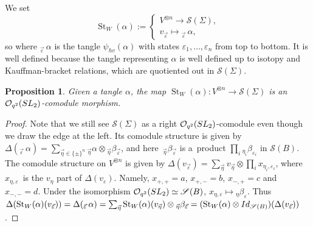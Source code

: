 \documentclass[11pt]{article}
\numberwithin{equation}{section}
\numberwithin{equation}{section}
\newtheorem{Proposition}[Theorem]{Proposition}
 { \theoremstyle{definition}
\newtheorem{Definition}[Theorem]{Definition}
\newtheorem{Note}[Theorem]{Note}
\newtheorem{Example}[Theorem]{Example}
\newtheorem{Remark}[Theorem]{Remark} }
\newcommand{\St}{\operatorname{St}}
\newcommand{\Oq}{\mathcal{O}_{q^2}({\rm SL}_2)}
\begin{document}
\begin{Definition}
We set
\[
\St_W(\alpha) := \begin{cases}
V^{\otimes n} \to \mathscr{S}(\Sigma),
\\
v_{\vec{\varepsilon}} \mapsto {}_{\vec{\varepsilon}}\,\alpha,
\end{cases}
\]
so where ${}_{\vec{\varepsilon}}\,\alpha$ is the tangle $\psi_{hv}(\alpha)$ with states $\varepsilon_1,\dots,\varepsilon_n$ from top to bottom. It is well defined because the tangle representing $\alpha$ is well defined up to isotopy and Kauffman-bracket relations, which are quotiented out in $\mathscr{S}(\Sigma)$.
\end{Definition}

\begin{Proposition}\label{propStOqmorph}
Given a tangle $\alpha$, the map $\St_W(\alpha)\colon V^{\otimes n}\to\mathscr{S}(\Sigma)$ is an $\Oq$-comodule morphism.
\end{Proposition}
\begin{proof}
Note that we still see $\mathscr{S}(\Sigma)$ as a right $\Oq$-comodule even though we draw the edge at the left. Its comodule structure is given by $\Delta(_{\vec{\varepsilon}}\,\alpha) = \sum_{\vec{\eta} \in \{\pm\}^n} {}_{\vec{\eta}}\alpha \otimes {}_{\vec{\eta}}\beta_{\vec{\varepsilon}}$, and here~${}_{\vec{\eta}}\beta_{\vec{\varepsilon}}$ is a~product $\prod_i {}_{\eta_i}\beta_{\varepsilon_i}$ in $\mathscr{S}(B)$. The comodule structure on $V^{\otimes n}$ is given by $\Delta(v_{\vec{\varepsilon}}) = \sum_{\vec{\eta}} v_{\vec{\eta}} \otimes \prod_i x_{\eta_i,\varepsilon_i}$, where $x_{\eta,\varepsilon}$~is the $v_\eta$ part of $\Delta(v_\varepsilon)$. Namely, $x_{+,+} = a$, $x_{+,-}=b$, $x_{-,+}=c$ and $x_{-,-}=d$. Under the isomorphism $\Oq \simeq \mathscr{S}(B)$, $x_{\eta,\varepsilon}\mapsto {}_\eta\beta_{\varepsilon}$.
 Thus $\Delta(\St_W(\alpha)(v_{\vec{\varepsilon}})) = \Delta(_{\vec{\varepsilon}}\,\alpha) = \sum_{\vec{\eta}} \St_W(\alpha)(v_{\vec{\eta}}) \otimes {}_{\vec{\eta}}\beta_{\vec{\varepsilon}} = (\St_W(\alpha)\otimes {\rm Id}_{\mathscr{S}(B)})(\Delta(v_{\vec{\varepsilon}}))$.
\end{proof}
\end{document}
